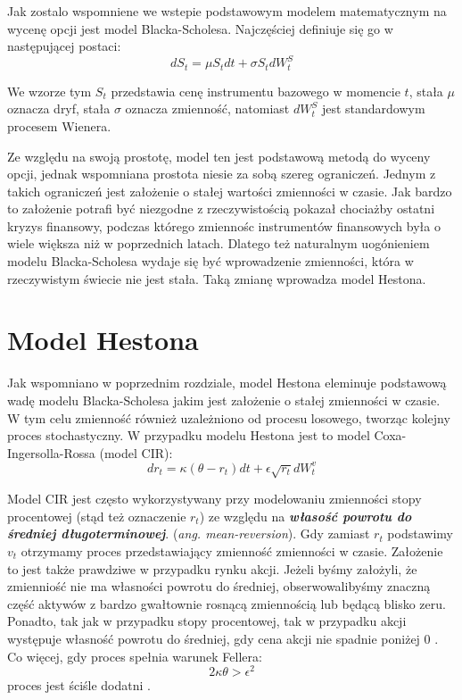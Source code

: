 \documentclass{pracamgr}
\begin{document}
Jak zostalo wspomniene we wstepie podstawowym modelem matematycznym na wycenę opcji jest model Blacka-Scholesa. Najczęściej definiuje się go w następującej postaci:
\begin{equation}
dS_t  = \mu S_t dt + \sigma S_t dW^S_t
\end{equation}

We wzorze tym $S_t$ przedstawia cenę instrumentu bazowego w momencie $t$, stała $\mu$ oznacza dryf, stała $\sigma$ oznacza zmienność, natomiast $dW^S_t$ jest standardowym procesem Wienera.


Ze względu na swoją prostotę, model ten jest podstawową metodą do wyceny opcji, jednak wspomniana prostota niesie za sobą szereg ograniczeń. Jednym z takich ograniczeń jest założenie o stałej wartości zmienności w czasie. Jak bardzo to założenie potrafi być niezgodne z rzeczywistością pokazał chociażby ostatni kryzys finansowy, podczas którego zmiennośc instrumentów finansowych była o wiele większa niż w poprzednich latach. Dlatego też naturalnym uogónieniem modelu Blacka-Scholesa wydaje się być wprowadzenie zmienności, która w rzeczywistym świecie nie jest stała. Taką zmianę wprowadza model Hestona. 


\section{Model Hestona}
Jak wspomniano w poprzednim rozdziale, model Hestona eleminuje podstawową wadę modelu Blacka-Scholesa jakim jest założenie o stałej zmienności w czasie.
W tym celu zmienność również uzależniono od procesu losowego, tworząc kolejny proces stochastyczny. W przypadku modelu Hestona jest to model Coxa-Ingersolla-Rossa (model CIR):
\begin{equation}
dr_t  = \kappa (\theta  - r_t)dt + \epsilon \sqrt{r_t} dW_t^v 
\end{equation}

Model CIR jest często wykorzystywany przy modelowaniu zmienności stopy procentowej (stąd też oznaczenie $r_t$) ze względu na \textbf{\textit{własość powrotu do średniej długoterminowej}}. 
(\textit{ang. mean-reversion}). Gdy zamiast $r_t$ podstawimy $v_t$ otrzymamy proces przedstawiający zmienność zmienności w czasie. Założenie to jest także prawdziwe w przypadku rynku 
akcji. Jeżeli byśmy założyli, że zmienniość nie ma własności powrotu do średniej, obserwowalibyśmy znaczną część aktywów z bardzo gwałtownie rosnącą zmiennością lub będącą blisko zeru.
Ponadto, tak jak w przypadku stopy procentowej, tak w przypadku akcji występuje własność powrotu do średniej, gdy cena akcji nie spadnie poniżej 0 \cite{TestingMeanReversion}.
Co więcej, gdy proces spełnia warunek Fellera:
\begin{equation}
2 \kappa \theta > \epsilon^2
\end{equation}
proces jest ściśle dodatni \cite{TheLittleHestonTrap}.
\end{document}

